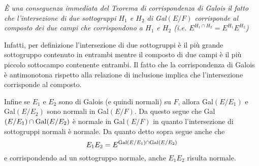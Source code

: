 \smallskip{} \it
 \`E una conseguenza immediata del Teorema di corrispondenza di
Galois il fatto che l'intersezione di due sottogruppi $H_1$ e
$H_2$ di {\rm Gal}$(E/F)$ corrisponde al composto dei due campi
che corrispondono a $H_1$ e $H_2$ (i.e. $E^{H_1\cap
H_2}=E^{H_1}E^{H_2}$)

Infatti, per definizione l'intersezione di due sottogruppi \`e il
pi\`u grande sottogruppo contenuto in entrambi mentre il composto
di due campi \`e il pi\`u piccolo sottocampo contenente entrambi.
Il fatto che la corrispondenza di Galois \`e antimonotona rispetto
alla relazione di inclusione implica che l'intersezione
corrisponde al composto.

Infine se $E_1$ e $E_2$ sono di Galois (e quindi normali) su $F$,
allora {\rm Gal}$(E/E_1)$ e {\rm Gal}$(E/E_2)$ sono normali in
{\rm Gal}$(E/F)$. Da questo segue che {\rm Gal}$(E/E_1)\cap{\rm
Gal}(E/E_2)$ \`e normale in {\rm Gal}$(E/F)$ in quanto
l'intersezione di sottogruppi normali \`{e} normale. Da quanto
detto sopra segue anche che
$$E_1E_2=E^{{\rm Gal}(E/E_1)\cap{\rm
Gal}(E/E_2)}$$ e corrispondendo ad un sottogruppo normale, anche
$E_1E_2$ risulta normale. \bye
